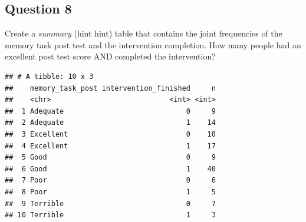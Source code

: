 \documentclass[]{book}
\newenvironment{Shaded}{\begin{snugshade}}{\end{snugshade}}
\newcommand{\CommentTok}[1]{\textcolor[rgb]{0.56,0.35,0.01}{\textit{#1}}}
\newcommand{\DataTypeTok}[1]{\textcolor[rgb]{0.13,0.29,0.53}{#1}}
\newcommand{\FloatTok}[1]{\textcolor[rgb]{0.00,0.00,0.81}{#1}}
\newcommand{\KeywordTok}[1]{\textcolor[rgb]{0.13,0.29,0.53}{\textbf{#1}}}
\newcommand{\NormalTok}[1]{#1}
\newcommand{\OperatorTok}[1]{\textcolor[rgb]{0.81,0.36,0.00}{\textbf{#1}}}
\newcommand{\StringTok}[1]{\textcolor[rgb]{0.31,0.60,0.02}{#1}}
\theoremstyle{definition}
\theoremstyle{definition}
\theoremstyle{definition}
\theoremstyle{remark}
\begin{document}
\hypertarget{question-8-1}{%
\subsection{Question 8}\label{question-8-1}}

Create a \emph{summary} (hint hint) table that contains the joint frequencies of the memory task post test and the intervention completion. How many people had an excellent post test score AND completed the intervention?

\begin{Shaded}
\end{Shaded}

\begin{verbatim}
## # A tibble: 10 x 3
##    memory_task_post intervention_finished     n
##    <chr>                            <int> <int>
##  1 Adequate                             0     9
##  2 Adequate                             1    14
##  3 Excellent                            0    10
##  4 Excellent                            1    17
##  5 Good                                 0     9
##  6 Good                                 1    40
##  7 Poor                                 0     6
##  8 Poor                                 1     5
##  9 Terrible                             0     7
## 10 Terrible                             1     3
\end{verbatim}

\begin{Shaded}
\end{Shaded}
\end{document}
